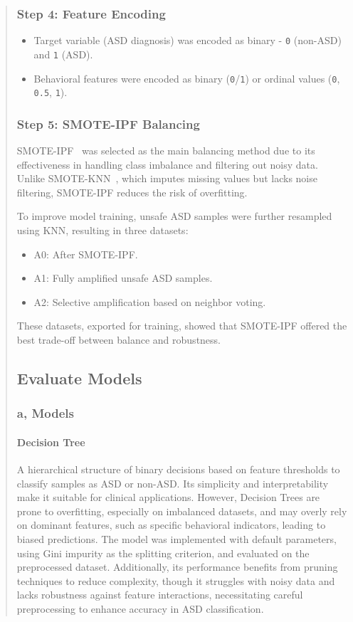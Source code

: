 \documentclass[runningheads]{llncs}
\begin{document}
\begin{abstract}
\subsubsection{\textbf{Step 4:} Feature Encoding}
\begin{itemize}[noitemsep, topsep=2pt]
    \item Target variable (ASD diagnosis) was encoded as binary - \texttt{0} (non-ASD) and \texttt{1} (ASD). 
    \item Behavioral features were encoded as binary (\texttt{0}/\texttt{1}) or ordinal values (\texttt{0}, \texttt{0.5}, \texttt{1}).
\end{itemize}

\subsubsection{\textbf{Step 5:} SMOTE-IPF Balancing}

SMOTE-IPF~\cite{b6} was selected as the main balancing method due to its effectiveness in handling class imbalance and filtering out noisy data. Unlike SMOTE-KNN~\cite{b7}, which imputes missing values but lacks noise filtering, SMOTE-IPF reduces the risk of overfitting.

To improve model training, unsafe ASD samples were further resampled using KNN, resulting in three datasets:
\begin{itemize}
\item A0: After SMOTE-IPF.
\item A1: Fully amplified unsafe ASD samples.
\item A2: Selective amplification based on neighbor voting.
\end{itemize}

These datasets, exported for training, showed that SMOTE-IPF offered the best trade-off between balance and robustness.

\subsection{Evaluate Models}
\subsubsection{a, Models}
\paragraph{\textbf{Decision Tree}}
A hierarchical structure of binary decisions based on feature thresholds to classify samples as ASD or non-ASD. Its simplicity and interpretability make it suitable for clinical applications. However, Decision Trees are prone to overfitting, especially on imbalanced datasets, and may overly rely on dominant features, such as specific behavioral indicators, leading to biased predictions. The model was implemented with default parameters, using Gini impurity as the splitting criterion, and evaluated on the preprocessed dataset. Additionally, its performance benefits from pruning techniques to reduce complexity, though it struggles with noisy data and lacks robustness against feature interactions, necessitating careful preprocessing to enhance accuracy in ASD classification.

\end{abstract}
\end{document}
